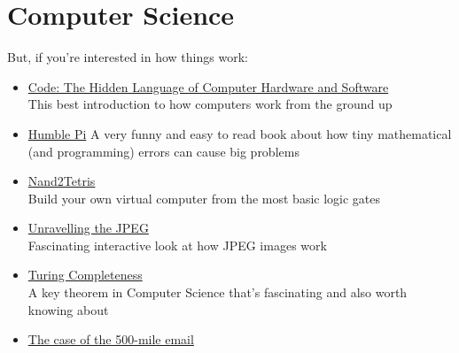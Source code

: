 \pagebreak

\section*{Computer Science}


But, if you're interested in how things work:

\begin{itemize}[leftmargin=*]
    \item
        \href{https://blackwells.co.uk/bookshop/product/Code-by-Charles-Petzold/9780735611313}{Code: The Hidden Language of Computer Hardware and Software}\\
        This best introduction to how computers work from the ground up
    \item
        \href{https://blackwells.co.uk/bookshop/product/Humble-Pi-by-Matt-Parker-author/9780241360231}{Humble Pi}
        A very funny and easy to read book about how tiny mathematical (and programming) errors can cause big problems
    \item
        \href{https://www.nand2tetris.org}{Nand2Tetris}\\
        Build your own virtual computer from the most basic logic gates
    \item
        \href{https://parametric.press/issue-01/unraveling-the-jpeg/}{Unravelling the JPEG}\\
        Fascinating interactive look at how JPEG images work
    \item
        \href{https://en.wikipedia.org/wiki/Turing_completeness}{Turing Completeness}\\
        A key theorem in Computer Science that's fascinating and also worth knowing about
    \item
        \href{https://www.ibiblio.org/harris/500milemail.html}{The case of the 500-mile email}
\end{itemize}
